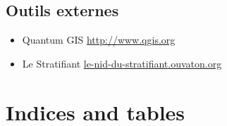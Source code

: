 \documentclass[letterpaper,10pt,french]{sphinxmanual}
\begin{document}
\section{Outils externes}
\label{manuel/liens:outils-externes}\begin{itemize}
\item {} 
Quantum GIS \href{http://www.qgis.org}{http://www.qgis.org}

\item {} 
Le Stratifiant \href{http://le-nid-du-stratifiant.ouvaton.org/}{le-nid-du-stratifiant.ouvaton.org}

\end{itemize}


\chapter{Indices and tables}
\label{index:indices-and-tables}


\renewcommand{\indexname}{Index}
\printindex
\end{document}
